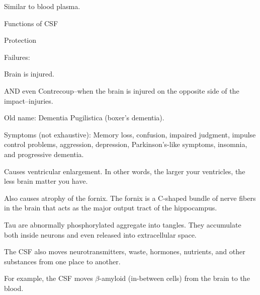\begin{coloredlist}
    \item Similar to blood plasma.
    \item Functions of CSF
    \begin{coloredlist}
        \item Protection
        \begin{coloredlist}
            \item Failures:
            \begin{coloredlist}
                \item Brain is injured.
                \item AND even Contrecoup--when the brain is injured on the opposite side of the impact--injuries.
                \item {}
                \begin{coloredlist}
                    \item Old name: Dementia Pugilistica (boxer's dementia).
                    \item Symptoms (not exhaustive): Memory loss, confusion, impaired judgment, impulse control problems, aggression, depression, Parkinson's-like symptoms, insomnia, and progressive dementia.
                    \item Causes ventricular enlargement. In other words, the larger your ventricles, the less brain matter you have.
                    \item Also causes atrophy of the fornix. The fornix is a C-shaped bundle of nerve fibers in the brain that acts as the major output tract of the hippocampus.
                    \item Tau are abnormally phosphorylated aggregate into tangles. They accumulate both inside neurons and even released into extracellular space.
                \end{coloredlist}
            \end{coloredlist}
        \end{coloredlist}
        \item The CSF also moves neurotransmitters, waste, hormones, nutrients, and other substances from one place to another.
        \begin{coloredlist}
            \item For example, the CSF moves \(\beta\)-amyloid (in-between cells) from the brain to the blood.
        \end{coloredlist}
    \end{coloredlist}

\end{coloredlist}
